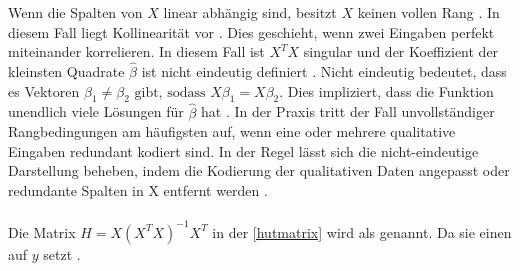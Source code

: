 Wenn die Spalten von \( X \) linear abhängig sind, besitzt \( X \) keinen vollen Rang \cite{hastie2009elements}. In diesem Fall liegt Kollinearität vor \cite{Maronna2019Robust}. Dies geschieht, wenn zwei Eingaben perfekt miteinander korrelieren. In diesem Fall ist \(X^TX\) singular und der Koeffizient der kleinsten Quadrate $\hat{\beta}$ ist nicht eindeutig definiert \cite{hastie2009elements}. Nicht eindeutig bedeutet, dass es Vektoren \(\beta_1 \neq \beta_2 \text{ gibt, sodass } X\beta_1 = X\beta_2\). Dies impliziert, dass die Funktion unendlich viele Lösungen für $\hat{\beta}$ hat \cite{Maronna2019Robust}. In der Praxis tritt der Fall unvollständiger Rangbedingungen am häufigsten auf, wenn eine oder mehrere qualitative Eingaben redundant kodiert sind. In der Regel lässt sich die nicht-eindeutige Darstellung beheben, indem die Kodierung der qualitativen Daten angepasst oder redundante Spalten in X entfernt werden \cite{hastie2009elements}. \\\\
Die Matrix \( H = X (X^T X)^{-1} X^T \) in der \autoref{hutmatrix} wird als  genannt. Da sie einen  auf \(y\) setzt \cite{huber1981robust}. 

